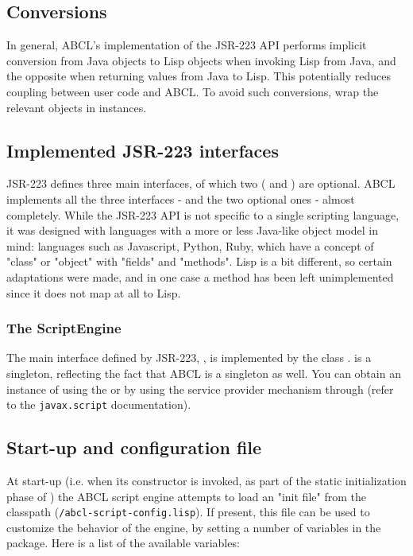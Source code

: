 \documentclass[10pt]{book}
\begin{document}
\subsection{Conversions}

In general, ABCL's implementation of the JSR-223 API performs implicit
conversion from Java objects to Lisp objects when invoking Lisp from
Java, and the opposite when returning values from Java to Lisp. This
potentially reduces coupling between user code and ABCL. To avoid such
conversions, wrap the relevant objects in  instances.

\subsection{Implemented JSR-223 interfaces}

JSR-223 defines three main interfaces, of which two (
and ) are optional. ABCL implements all the three
interfaces -  and the two optional ones - almost
completely. While the JSR-223 API is not specific to a single scripting
language, it was designed with languages with a more or less Java-like
object model in mind: languages such as Javascript, Python, Ruby, which
have a concept of "class" or "object" with "fields" and "methods". Lisp
is a bit different, so certain adaptations were made, and in one case a
method has been left unimplemented since it does not map at all to Lisp.

\subsubsection{The ScriptEngine}

The main interface defined by JSR-223, ,
is implemented by the class
. 
is a singleton, reflecting the fact that ABCL is a singleton as
well. You can obtain an instance of  using the
 or by using the service provider
mechanism through  (refer to the
\texttt{javax.script} documentation).

\subsection{Start-up and configuration file}

At start-up (i.e. when its constructor is invoked, as part of the
static initialization phase of ) the ABCL
script engine attempts to load an "init file" from the classpath
(\texttt{/abcl-script-config.lisp}). If present, this file can be used to
customize the behavior of the engine, by setting a number of
variables in the  package. Here is a list of the available
variables:
\end{document}
